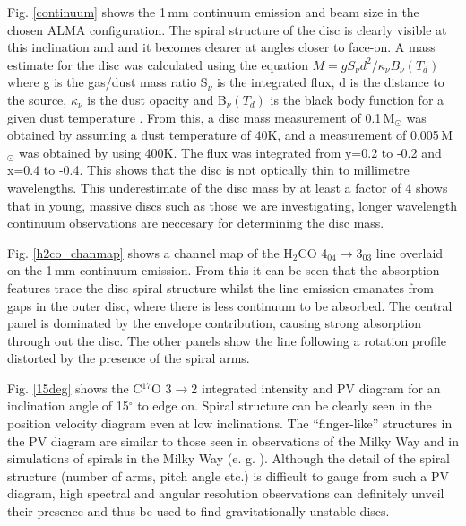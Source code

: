 \documentclass[useAMS,usenatbib]{mn2e}
\begin{document}
Fig. \ref{continuum} shows the 1\,mm continuum emission and beam size in the chosen ALMA configuration. The spiral structure of the disc is clearly visible at this inclination and and it becomes clearer at angles closer to face-on. A mass estimate for the disc was calculated using the equation $M=g S_\nu d^2/\kappa_\nu B_\nu(T_d)$ where g is the gas/dust mass ratio S$_\nu$ is the integrated flux, d is the distance to the source, $\kappa_\nu$ is the dust opacity and B$_\nu(T_d)$ is the black body function for a given dust temperature \citep{Beltran2006}. From this, a disc mass measurement of 0.1$\,$M$_\odot$ was obtained by assuming a dust temperature of 40K, and a measurement of 0.005$\,$M$_\odot$ was obtained by using 400K. The flux was integrated from y=0.2 to -0.2 and x=0.4 to -0.4. This shows that the disc is not optically thin to millimetre wavelengths. This underestimate of the disc mass by at least a factor of 4 shows that in young, massive discs such as those we are investigating, longer wavelength continuum observations are neccesary for determining the disc mass.\smallskip

Fig. \ref{h2co_chanmap} shows a channel map of the H$_2$CO 4$_{04}\rightarrow$3$_{03}$ line overlaid on the 1$\,$mm continuum emission. From this it can be seen that the absorption features trace the disc spiral structure whilst the line emission emanates from gaps in the outer disc, where there is less continuum to be absorbed. The central panel is dominated by the envelope contribution, causing strong absorption through out the disc. The other panels show the line following a rotation profile distorted by the presence of the spiral arms. \smallskip

Fig. \ref{15deg} shows the C$^{17}$O 3$\rightarrow$2 integrated intensity and PV diagram for an inclination angle of 15$^\circ$ to edge on. Spiral structure can be clearly seen in the position velocity diagram even at low inclinations. The ``finger-like'' structures in the PV diagram are similar to those seen in observations of the Milky Way and in simulations of spirals in the Milky Way (e. g. \citealt{Bissantz2003}). Although the detail of the spiral structure (number of arms, pitch angle etc.) is difficult to gauge from such a PV diagram, high spectral and angular resolution observations can definitely unveil their presence and thus be used to find gravitationally unstable discs. \smallskip
\end{document}
